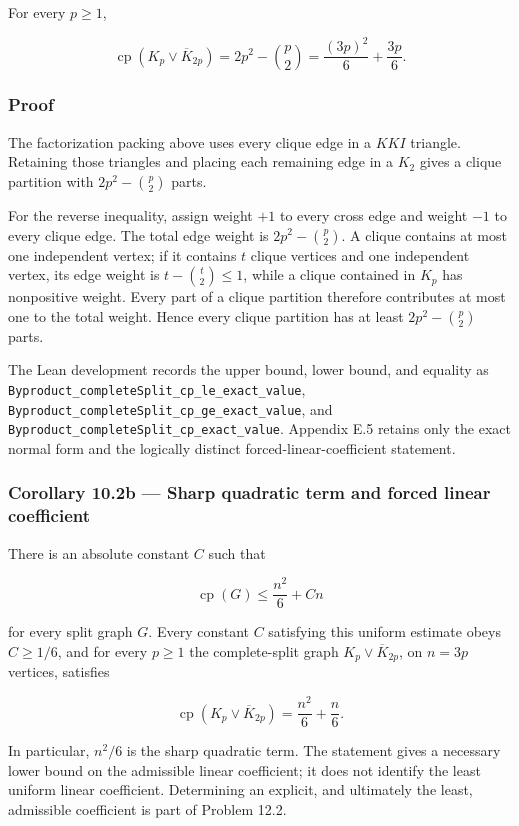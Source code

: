 \documentclass[
  american,
  11pt,
  a4paper,
]{article}
\begin{document}
For every \(p\ge1\),

\[
\operatorname{cp}\!\left(K_p\vee\overline K_{2p}\right)
=
2p^2-\binom p2
=
\frac{(3p)^2}{6}+\frac{3p}{6}.
\tag{10.1a}
\]

\subsubsection{Proof}\label{proof-6}

The factorization packing above uses every clique edge in a \(KKI\) triangle. Retaining those triangles and placing each remaining edge in a \(K_2\) gives a clique partition with \(2p^2-\binom p2\) parts.

For the reverse inequality, assign weight \(+1\) to every cross edge and weight \(-1\) to every clique edge. The total edge weight is \(2p^2-\binom p2\). A clique contains at most one independent vertex; if it contains \(t\) clique vertices and one independent vertex, its edge weight is \(t-\binom t2\le1\), while a clique contained in \(K_p\) has nonpositive weight. Every part of a clique partition therefore contributes at most one to the total weight. Hence every clique partition has at least \(2p^2-\binom p2\) parts.

The Lean development records the upper bound, lower bound, and equality as \texttt{Byproduct\_completeSplit\_cp\_le\_exact\_value}, \texttt{Byproduct\_completeSplit\_cp\_ge\_exact\_value}, and \texttt{Byproduct\_completeSplit\_cp\_exact\_value}. Appendix E.5 retains only the exact normal form and the logically distinct forced-linear-coefficient statement.

\subsubsection{Corollary 10.2b --- Sharp quadratic term and forced linear coefficient}\label{corollary-10.2b-sharp-quadratic-term-and-forced-linear-coefficient}

There is an absolute constant \(C\) such that

\[
\operatorname{cp}(G)\le \frac{n^2}{6}+Cn
\]

for every split graph \(G\). Every constant \(C\) satisfying this uniform estimate obeys \(C\ge1/6\), and for every \(p\ge1\) the complete-split graph \(K_p\vee\overline K_{2p}\), on \(n=3p\) vertices, satisfies

\[
\operatorname{cp}\!\left(K_p\vee\overline K_{2p}\right)
=\frac{n^2}{6}+\frac n6.
\]

In particular, \(n^2/6\) is the sharp quadratic term. The statement gives a necessary lower bound on the admissible linear coefficient; it does not identify the least uniform linear coefficient. Determining an explicit, and ultimately the least, admissible coefficient is part of Problem 12.2.
\end{document}
